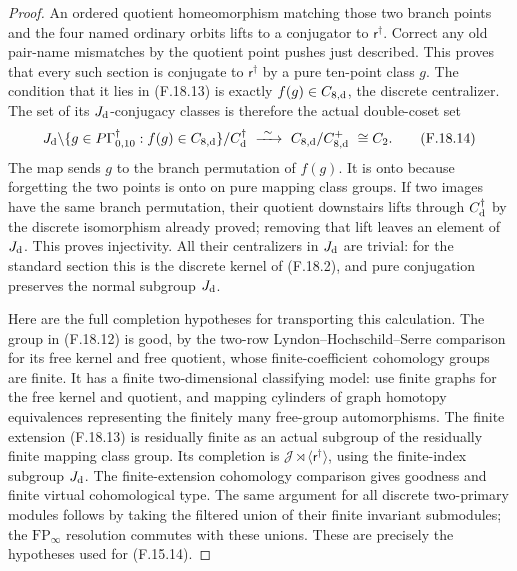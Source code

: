 \begin{proof}
An ordered quotient homeomorphism matching those
two branch points and the four named ordinary
orbits lifts to a conjugator to
$\mathsf r^\dagger$.  Correct any old pair-name
mismatches by the quotient point pushes just
described.  This proves that every such section
is conjugate to $\mathsf r^\dagger$ by a pure
ten-point class $g$.
The condition that it lies in (F.18.13) is exactly
$f(g)\in C_{8,{\rm d}}$, the discrete centralizer.
The set of its $J_{\rm d}$-conjugacy classes is
therefore the actual double-coset set
\[
 J_{\rm d}\backslash
       \{g\in P\Gamma_{0,10}^{\dagger}:f(g)\in C_{8,{\rm d}}\}
       /C^\dagger_{\rm d}
       \ \xrightarrow{\ \sim\ }\
       C_{8,{\rm d}}/C_{8,{\rm d}}^+
       \ \cong C_2 .                                         \tag{F.18.14}
\]
The map sends $g$ to the branch permutation of $f(g)$.
It is onto because forgetting the two points is
onto on pure mapping class groups.
If two images have the same branch permutation,
their quotient downstairs lifts through
$C^\dagger_{\rm d}$ by the discrete isomorphism
already proved; removing that lift leaves an
element of $J_{\rm d}$.  This proves injectivity.
All their centralizers in $J_{\rm d}$ are trivial:
for the standard section this is the discrete
kernel of (F.18.2), and pure conjugation preserves
the normal subgroup $J_{\rm d}$.

Here are the full completion hypotheses for
transporting this calculation.
The group in (F.18.12) is good, by the two-row
Lyndon--Hochschild--Serre comparison for its free
kernel and free quotient, whose finite-coefficient
cohomology groups are finite.
It has a finite two-dimensional classifying model:
use finite graphs for the free kernel and quotient,
and mapping cylinders of graph homotopy equivalences
representing the finitely many free-group automorphisms.
The finite extension (F.18.13) is residually finite
as an actual subgroup of the residually finite
mapping class group.  Its completion is
$\mathcal J\rtimes\langle\mathsf r^\dagger\rangle$,
using the finite-index subgroup $J_{\rm d}$.
The finite-extension cohomology comparison gives
goodness and finite virtual cohomological type.
The same argument for all discrete two-primary
modules follows by taking the filtered union of
their finite invariant submodules; the
$\mathrm{FP}_\infty$ resolution commutes with
these unions.  These are precisely the
hypotheses used for (F.15.14).


\end{proof}
